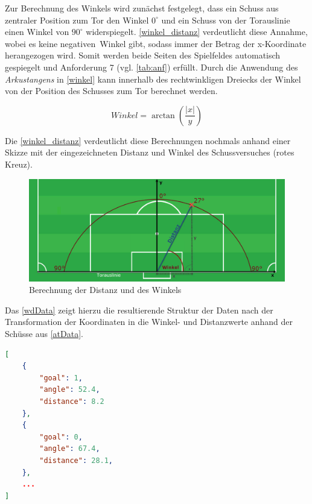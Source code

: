 Zur Berechnung des Winkels wird zunächst festgelegt, dass ein Schuss aus zentraler Position zum Tor den Winkel $0^\circ$ und ein Schuss von der Torauslinie einen Winkel von $90^\circ$ widerspiegelt. \vref{winkel_distanz} verdeutlicht diese Annahme, wobei es keine \glqq negativen\grqq~Winkel gibt, sodass immer der Betrag der x-Koordinate herangezogen wird. Somit werden beide Seiten des Spielfeldes automatisch gespiegelt und Anforderung 7 (vgl. \vref{tab:anf}) erfüllt. Durch die Anwendung des \textit{Arkustangens} in \vref{winkel} kann innerhalb des rechtwinkligen Dreiecks der Winkel von der Position des Schusses zum Tor berechnet werden.

\begin{equation}
\label{winkel}
Winkel= \arctan(\frac{|x|}{y})
\end{equation}

Die \vref{winkel_distanz} verdeutlicht diese Berechnungen nochmals anhand einer Skizze mit der eingezeichneten Distanz und Winkel des Schussversuches (rotes Kreuz).

\begin{figure}[H]
\centering
\includegraphics[scale=0.45]{se-wa-jpg/winkel_distanz}
\caption[Berechnung der Distanz und des Winkels]{Berechnung der Distanz und des Winkels}
\label{winkel_distanz}
\end{figure}

Das \vref{wdData} zeigt hierzu die resultierende Struktur der Daten nach der Transformation der Koordinaten in die Winkel- und Distanzwerte anhand der Schüsse aus \vref{atData}.\newline

\begin{lstlisting}[caption=\captionListingText,language=json,xleftmargin=5mm,label=wdData] 
[
	{
		"goal": 1,
		"angle": 52.4,
		"distance": 8.2
	},
	{
		"goal": 0,
		"angle": 67.4,
		"distance": 28.1,
	},
	...
]
\end{lstlisting}

